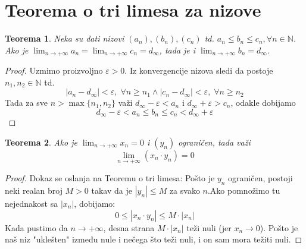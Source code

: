 \documentclass[a4paper,12pt]{article}
\theoremstyle{plain}
\newtheorem{theorem}{Teorema}[section]
\theoremstyle{definition}
\theoremstyle{remark}
\begin{document}
\section{Teorema o tri limesa za nizove}
\begin{theorem}
    Neka su dati nizovi $(a_n), (b_n), (c_n)$ td. $a_n \leq b_n \leq c_n, \forall n \in \mathbb{N}$. Ako je \linebreak$\displaystyle \lim_{n \to +\infty} a_n = \lim_{n \to +\infty} c_n = d_\infty$, tada je i $\displaystyle \lim_{n \to +\infty} b_n = d_\infty$.
\end{theorem}
\begin{proof}
    Uzmimo proizvoljno $\varepsilon > 0$. Iz konvergencije nizova sledi da postoje $n_1, n_2 \in \mathbb{N}$ td. 
    \[ |a_n - d_\infty| < \varepsilon, \; \forall n \geq n_1 \land  |c_n - d_\infty| < \varepsilon , \; \forall n \geq n_2\]
    Tada za sve $n > \max\{n_1, n_2\}$ važi $d_\infty - \varepsilon < a_n$ i $d_\infty + \varepsilon > c_n$, odakle dobijamo
    \[ d_\infty - \varepsilon < a_n \leq b_n \leq c_n < d_\infty + \varepsilon \]
\end{proof}

\begin{theorem}
    Ako je $\lim_{n \to +\infty} x_n = 0$ i $(y_n)$ ograničen, tada važi
    \[ \lim_{n \to +\infty}(x_n \cdot y_n) = 0 \]
\end{theorem}
\begin{proof}
    Dokaz se oslanja na Teoremu o tri limesa: Pošto je $y_n$ ograničen, postoji neki realan broj $M > 0$ takav da je $|y_n| \le M$ za svako $n$.Ako pomnožimo tu nejednakost sa $|x_n|$, dobijamo:$$0 \le |x_n \cdot y_n| \le M \cdot |x_n|$$Kada pustimo da $n \to +\infty$, desna strana $M \cdot |x_n|$ teži nuli (jer $x_n \to 0$). Pošto je naš niz "uklešten" između nule i nečega što teži nuli, i on sam mora težiti nuli.
\end{proof}
\end{document}
